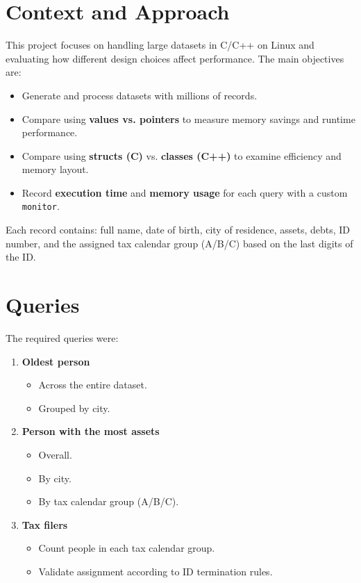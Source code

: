 \documentclass[11pt,letterpaper,oneside]{article}
\begin{document}


\tableofcontents

\iftotalfigures
    \listoffigures
\fi


\clearpage


\section{Context and Approach}

This project focuses on handling large datasets in C/C++ on Linux and evaluating
how different design choices affect performance. The main objectives are:
\begin{itemize}
    \item Generate and process datasets with millions of records.
    \item Compare using \textbf{values vs. pointers} to measure memory savings
    and runtime performance.
    \item Compare using \textbf{structs (C)} vs. \textbf{classes (C++)} to
    examine efficiency and memory layout.
    \item Record \textbf{execution time} and \textbf{memory usage} for each
    query with a custom \texttt{monitor}.
\end{itemize}

Each record contains: full name, date of birth, city of residence, assets,
debts, ID number, and the assigned tax calendar group (A/B/C) based on the last
digits of the ID.

\section{Queries}

The required queries were:
\begin{enumerate}
    \item \textbf{Oldest person}
    \begin{itemize}
        \item Across the entire dataset.
        \item Grouped by city.
    \end{itemize}
    \item \textbf{Person with the most assets}
    \begin{itemize}
        \item Overall.
        \item By city.
        \item By tax calendar group (A/B/C).
    \end{itemize}
    \item \textbf{Tax filers}
    \begin{itemize}
        \item Count people in each tax calendar group.
        \item Validate assignment according to ID termination rules.
    \end{itemize}
\end{enumerate}
\end{document}
